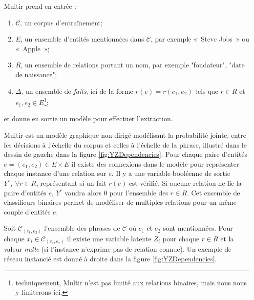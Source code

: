 \documentclass[12pt,a4paper,times,twoside,openright]{report}
\begin{document}
Multir prend en entrée :
\begin{enumerate}
    \item $\mathcal{C}$, un corpus d'entraînement;
    \item $E$, un ensemble d'entités mentionnées dans $\mathcal{C}$, par exemple «\ Steve Jobs\ » ou «\ Apple\ »;
    \item $R$, un ensemble de relations portant un nom, par exemple "fondateur", "date de naissance";
    \item $\Delta$, un ensemble de \emph{faits}, ici de la forme $r(e) = r(e_{1},e_{2})$ tels que $r \in R$ et $e_{1},e_{2} \in E$\footnote{techniquement, Multir n'est pas limité aux relations binaires, mais nous nous y limiterons ici.};
\end{enumerate}
et donne en sortie un modèle pour effectuer l'extraction.

Multir est un modèle graphique non dirigé modélisant la probabilité jointe, entre les décisions à l'échelle du corpus et celles à l'échelle de la phrase, illustré dans le dessin de gauche dans la figure \ref{fig:YZDependencies}. Pour chaque paire d'entités $e = (e_{1},e_{2}) \in E \times E$ il existe des connexions dans le modèle pour représenter chaque instance d'une relation sur $e$. Il y a une variable booléenne de sortie $Y^{r},\ \forall r \in R$, représentant si un fait $r(e)$ est vérifié. Si aucune relation ne lie la paire d'entités $e$, $Y^{r}$ vaudra alors 0 pour l'ensemble des $r \in R$. Cet ensemble de classifieurs binaires permet de modéliser de multiples relations pour un même couple d'entités $e$.

Soit $\mathcal{C}_{(e_{1},e_{2})}$ l'ensemble des phrases de $\mathcal{C}$ où $e_{1}$ et $e_{2}$ sont mentionnées. Pour chaque $x_{i} \in \mathcal{C}_{(e_{1},e_{2})}$ il existe une variable latente $Z_{i}$ pour chaque $r \in R$ et la valeur \emph{nulle} (si l'instance n'exprime pas de relation connue). Un exemple de réseau instancié est donné à droite dans la figure \ref{fig:YZDependencies}.
\end{document}
